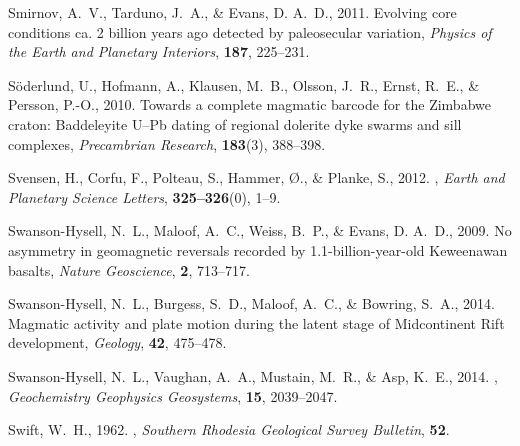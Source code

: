 \documentclass[11pt,letterpaper]{article}
\begin{document}
\begin{thebibliography}{49}
Smirnov, A.~V., Tarduno, J.~A., \& Evans, D. A.~D., 2011.
\newblock Evolving core conditions ca. 2 billion years ago detected by
  paleosecular variation, {\it Physics of the Earth and Planetary Interiors\/},
  {\bf 187}, 225--231.

S{\"o}derlund, U., Hofmann, A., Klausen, M.~B., Olsson, J.~R., Ernst, R.~E., \&
  Persson, P.-O., 2010.
\newblock Towards a complete magmatic barcode for the {Z}imbabwe craton:
  Baddeleyite {U--Pb} dating of regional dolerite dyke swarms and sill
  complexes, {\it Precambrian Research\/}, {\bf 183}(3), 388--398.

Svensen, H., Corfu, F., Polteau, S., Hammer, {\O}., \& Planke, S., 2012.
, {\it
  Earth and Planetary Science Letters\/}, {\bf 325--326}(0), 1--9.

Swanson-Hysell, N.~L., Maloof, A.~C., Weiss, B.~P., \& Evans, D. A.~D., 2009.
\newblock No asymmetry in geomagnetic reversals recorded by
  1.1-billion-year-old {K}eweenawan basalts, {\it Nature Geoscience\/}, {\bf
  2}, 713--717.

Swanson-Hysell, N.~L., Burgess, S.~D., Maloof, A.~C., \& Bowring, S.~A.,
  2014{}.
\newblock Magmatic activity and plate motion during the latent stage of
  {M}idcontinent {R}ift development, {\it Geology\/}, {\bf 42}, 475--478.

Swanson-Hysell, N.~L., Vaughan, A.~A., Mustain, M.~R., \& Asp, K.~E.,
  2014{}.
,
  {\it Geochemistry Geophysics Geosystems\/}, {\bf 15}, 2039--2047.

Swift, W.~H., 1962.
, {\it Southern Rhodesia
  Geological Survey Bulletin\/}, {\bf 52}.


\end{thebibliography}
\end{document}
